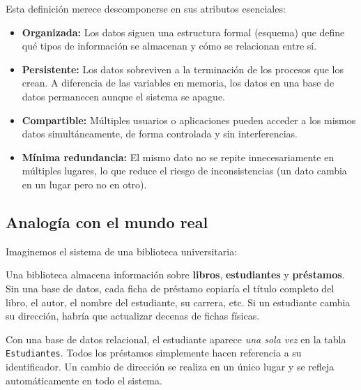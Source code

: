 \documentclass[12pt, a4paper]{article}
\begin{document}
	Esta definición merece descomponerse en sus atributos esenciales:
	
	\begin{itemize}
		\item \textbf{Organizada:} Los datos siguen una estructura formal
		(esquema) que define qué tipos de información se almacenan y
		cómo se relacionan entre sí.
		
		\item \textbf{Persistente:} Los datos sobreviven a la terminación
		de los procesos que los crean. A diferencia de las variables en
		memoria, los datos en una base de datos permanecen aunque el
		sistema se apague.
		
		\item \textbf{Compartible:} Múltiples usuarios o aplicaciones
		pueden acceder a los mismos datos simultáneamente, de forma
		controlada y sin interferencias.
		
		\item \textbf{Mínima redundancia:} El mismo dato no se repite
		innecesariamente en múltiples lugares, lo que reduce el riesgo
		de inconsistencias (un dato cambia en un lugar pero no en otro).
	\end{itemize}
	
	\subsection{Analogía con el mundo real}
	
	Imaginemos el sistema de una biblioteca universitaria:
	
	\begin{ejemplo}
		Una biblioteca almacena información sobre \textbf{libros},
		\textbf{estudiantes} y \textbf{préstamos}.
		Sin una base de datos, cada ficha de préstamo copiaría el título
		completo del libro, el autor, el nombre del estudiante, su carrera,
		etc.
		Si un estudiante cambia su dirección, habría que actualizar decenas
		de fichas físicas.
		
		Con una base de datos relacional, el estudiante aparece
		\emph{una sola vez} en la tabla \texttt{Estudiantes}.
		Todos los préstamos simplemente hacen referencia a su identificador.
		Un cambio de dirección se realiza en un único lugar y se refleja
		automáticamente en todo el sistema.
	\end{ejemplo}
	
	
\end{document}
